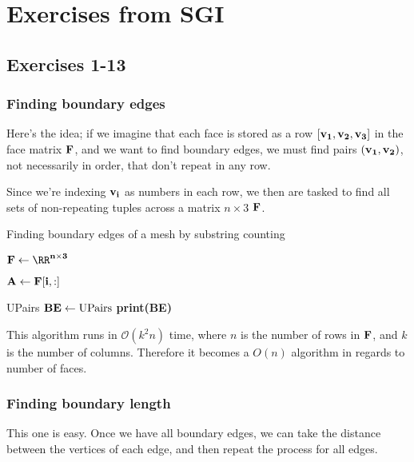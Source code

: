 \chapter{Exercises from SGI}

\section{Exercises 1-13}
\subsection{Finding boundary edges}

Here's the idea; if we imagine that each face is stored
as a row $[\bf{v_1, v_2, v_3}]$ in the face matrix
$\bf{F}$, and we want to find boundary edges, we must
find pairs $\bf{(v_1, v_2)}$, not necessarily in order,
that don't repeat in any row.



Since we're indexing $\bf{v}_i$ as numbers in each row,
we then are tasked to find all sets of non-repeating tuples
across a matrix $n \times 3$ $\bf{F}$.

\begin{algorithm}
\caption{Finding boundary edges of a mesh by substring counting}
\begin{algorithmic}[1]

\State $\bf{F} \gets \RR^{n \times 3}$
    
    \State $\bf{A} \gets \bf{F}[i,:]$
    \EndFor
    
    
\State \Return UPairs
\State $\bf{BE} \gets \text{UPairs}$
\State \textbf{print(BE)}
\EndProcedure
\end{algorithmic}
\end{algorithm}

This algorithm runs in $\mathcal{O}(k^2n)$ time, where
$n$ is the number of rows in $\bf{F}$, and $k$ is the
number of columns. Therefore it becomes a $O(n)$ algorithm
in regards to number of faces.


\subsection{Finding boundary length}

This one is easy. Once we have all boundary edges,
we can take the distance between the vertices of each edge,
and then repeat the process for all edges.

